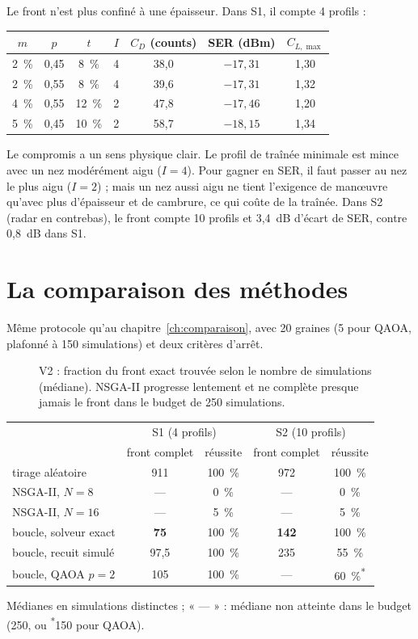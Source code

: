 Le front n'est plus confiné à une épaisseur. Dans S1, il compte 4 profils :
\begin{center}
\begin{tabular}{ccccccc}
\toprule
$m$ & $p$ & $t$ & $I$ & $C_D$ (counts) & SER (dBm) & $C_{L,\max}$ \\
\midrule
2~\% & 0,45 & 8~\% & 4 & 38,0 & $-17{,}31$ & 1,30 \\
2~\% & 0,55 & 8~\% & 4 & 39,6 & $-17{,}31$ & 1,32 \\
4~\% & 0,55 & 12~\% & 2 & 47,8 & $-17{,}46$ & 1,20 \\
5~\% & 0,45 & 10~\% & 2 & 58,7 & $-18{,}15$ & 1,34 \\
\bottomrule
\end{tabular}
\end{center}
Le compromis a un sens physique clair. Le profil de traînée minimale est mince avec un nez modérément aigu ($I=4$). Pour gagner en SER, il faut passer au nez le plus aigu ($I=2$) ; mais un nez aussi aigu ne tient l'exigence de manœuvre qu'avec plus d'épaisseur et de cambrure, ce qui coûte de la traînée. Dans S2 (radar en contrebas), le front compte 10 profils et 3,4~dB d'écart de SER, contre 0,8~dB dans S1.

\section{La comparaison des méthodes}
Même protocole qu'au chapitre~\ref{ch:comparaison}, avec 20 graines (5 pour QAOA, plafonné à 150 simulations) et deux critères d'arrêt.

\begin{figure}[htbp]
\centering

\caption{V2 : fraction du front exact trouvée selon le nombre de simulations (médiane). NSGA-II progresse lentement et ne complète presque jamais le front dans le budget de 250 simulations.}\label{fig:v2-conv}
\end{figure}

\begin{center}
\renewcommand{\arraystretch}{1.15}
\begin{tabular}{lcccc}
\toprule
 & \multicolumn{2}{c}{S1 (4 profils)} & \multicolumn{2}{c}{S2 (10 profils)} \\
 & front complet & réussite & front complet & réussite \\
\midrule
tirage aléatoire & 911 & 100~\% & 972 & 100~\% \\
NSGA-II, $N=8$ & --- & 0~\% & --- & 0~\% \\
NSGA-II, $N=16$ & --- & 5~\% & --- & 5~\% \\
boucle, solveur exact & \textbf{75} & 100~\% & \textbf{142} & 100~\% \\
boucle, recuit simulé & 97,5 & 100~\% & 235 & 55~\% \\
boucle, QAOA $p=2$ & 105 & 100~\% & --- & 60~\%\textsuperscript{*} \\
\bottomrule
\end{tabular}

\smallskip
{\footnotesize Médianes en simulations distinctes ; « --- » : médiane non atteinte dans le budget (250, ou \textsuperscript{*}150 pour QAOA).}
\end{center}

